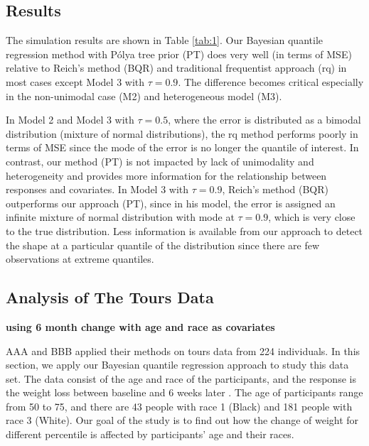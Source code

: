 \documentclass[12pt]{article}
\newcommand{\polya}{P\'{o}lya}
\begin{document}
\subsection{Results}
The simulation results are shown in Table \ref{tab:1}. Our
Bayesian quantile regression method with \polya{} tree prior (PT)
does very well (in terms of MSE) relative to Reich's method (BQR)
and traditional frequentist approach 
(rq) in most cases except Model 3 with $\tau = 0.9$.
The difference becomes critical especially in
the  non-unimodal case (M2) and heterogeneous model (M3). 

In Model 2 and Model 3 with $\tau=0.5$, where the error is
distributed as a bimodal distribution (mixture of normal
distributions), the rq method performs poorly in terms of MSE
since the mode of the error is no longer the quantile of
interest. In contrast, our method (PT) is not impacted by lack of
unimodality and heterogeneity and provides more information
for the relationship between responses and covariates. In Model 3
with $\tau=0.9$, Reich's method (BQR) outperforms our approach (PT),
since in his model, the error is assigned an infinite mixture of
normal distribution with mode at $\tau=0.9$, which is very close to
the true distribution. Less information is available from our
approach to detect the shape at a particular quantile of the
distribution since there are few observations at extreme quantiles. 

\subsection{Analysis of The Tours Data}
{\bf using 6 month change with age and race as covariates}

AAA and BBB applied their methods on tours data from 224
individuals. In this section, we apply our Bayesian quantile
regression approach to study this data set. The data consist of the
age and race of the participants, and the response is the  weight loss
between  baseline and  6 weeks later . The age of
participants range from 50 to 75, and there are 43 people with race 1
(Black) and 181 people with race 3
(White). Our goal of the study is to find out how the change of
weight for different percentile is affected by participants' age and
their races.  
\end{document}
